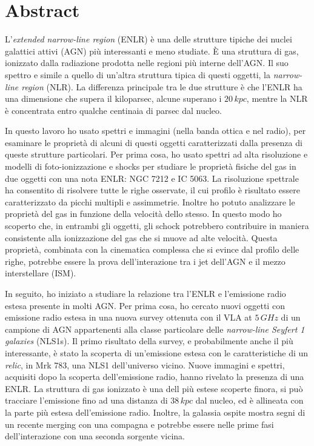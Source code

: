 \documentclass[../main.tex]{subfiles}
\begin{document}
\chapter{Abstract}
\label{sec:abstract}

L'\emph{extended narrow-line region} (ENLR) \`e una delle strutture tipiche dei nuclei galattici attivi (AGN) pi\`u interessanti e meno studiate.
\`E una struttura di gas, ionizzato dalla radiazione prodotta nelle regioni pi\`u interne dell'AGN.
Il suo spettro e simile a quello di un'altra struttura tipica di questi oggetti, la \emph{narrow-line region} (NLR).
La differenza principale tra le due strutture \`e che l'ENLR  ha una dimensione che supera il kiloparsec, alcune superano i $20\,\si{kpc}$, mentre la NLR \`e concentrata entro qualche centinaia di parsec dal nucleo.

In questo lavoro ho usato spettri e immagini (nella banda ottica e nel radio), per esaminare le propriet\`a di alcuni di questi oggetti caratterizzati dalla presenza di queste strutture particolari.
Per prima cosa, ho usato spettri ad alta risoluzione e modelli di foto-ionizzazione e shocks per studiare le propriet\`a fisiche del gas in due oggetti con una nota ENLR: NGC 7212 e IC 5063.
La risoluzione spettrale ha consentito di risolvere tutte le righe osservate, il cui profilo \`e risultato essere caratterizzato da picchi multipli e assimmetrie.
Inoltre ho potuto analizzare le propriet\`a del gas in funzione della velocit\`a dello stesso.
In questo modo ho scoperto che, in entrambi gli oggetti, gli schock potrebbero contribuire in maniera consistente alla ionizzazione del gas che si muove ad alte velocit\`a.
Questa propriet\`a, combinata con la cinematica complessa che si evince dal profilo delle righe, potrebbe essere la prova dell'interazione tra i jet dell'AGN e il mezzo interstellare (ISM).

In seguito, ho iniziato a studiare la relazione tra l'ENLR e l'emissione radio estesa presente in molti AGN.
Per prima cosa, ho cercato nuovi oggetti con emissione radio estesa in una nuova survey ottenuta con il VLA at $5\,\si{GHz}$ di un campione di AGN appartenenti alla classe particolare delle \emph{narrow-line Seyfert 1 galaxies} (NLS1s).
Il primo risultato della survey, e probabilmente anche il pi\`u interessante, \`e stato la scoperta di un'emissione estesa con le caratteristiche di un \emph{relic}, in Mrk 783, una NLS1 dell'universo vicino.
Nuove immagini e spettri, acquisiti dopo la scoperta dell'emissione radio, hanno rivelato la presenza di una ENLR.
La struttura di gas ionizzato \`e una dell pi\`u estese scoperte finora, si pu\`o tracciare l'emissione fino ad una distanza di $38\,\si{kpc}$ dal nucleo, ed \`e allineata con la parte pi\`u estesa dell'emissione radio.
Inoltre, la galassia ospite mostra segni di un recente merging con una compagna e potrebbe essere nelle prime fasi dell'interazione con una seconda sorgente vicina.
\end{document}
